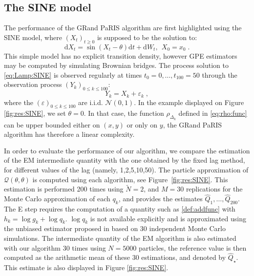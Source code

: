 \documentclass[12pt]{article}
\newcommand{\rmd}{\mathrm{d}}
\newcommand{\eqsp}{\;}
\newcommand{\1}{\mathrm{1}}
\newcommand{\hQ}{\widehat{Q}}
\begin{document}
\subsection*{The SINE model} 
The performance of the GRand PaRIS algorithm are first highlighted using the SINE model, where $(X_t)_{t\geq 0}$ is supposed to be the solution to: 
\begin{equation}
\rmd X_t = \sin \left(X_t-\theta\right)\rmd t + \rmd W_t,~~X_0=x_0\eqsp. \label{eq:Lamp:SINE}
\end{equation}
This simple model has no explicit transition density, however GPE estimators may be computed by simulating Brownian bridges.
The process solution to \eqref{eq:Lamp:SINE} is observed regularly at times $t_0=0,\ldots,t_{100}=50$ through the observation process $(Y_k)_{0\leq k \leq 100}$:
\begin{equation}
Y_k = X_k + \varepsilon_k\label{eq:obs:SINE}\eqsp,
\end{equation}
where the $(\varepsilon)_{0\leq k \leq 100}$ are i.i.d. $\mathcal{N}(0,1)$.
In the example displayed on Figure \ref{fig:res:SINE}, we set $\theta=0$.
In that case, the function $\rho_{\Delta_k}$ defined in \eqref{eq:rho:func} can be upper bounded either on $(x,y)$ or only on $y$, the GRand PaRIS algorithm has therefore a linear complexity.

In order to evaluate the performance of our algorithm, we compare the estimation of the EM intermediate quantity with the one obtained by the fixed lag method, for different values of the lag (namely, 1,2,5,10,50). The particle approximation of $\mathcal{Q}(\theta,\theta)$ is computed using each algorithm, see Figure~\ref{fig:res:SINE}. This estimation is performed 200 times using $\tilde{N}=2$, and $M=30$ replications for the Monte Carlo approximation of each $q_k$, and provides the estimates $\hQ_1,\dots,\hQ_{200}$.  The E step requires the computation of a quantity such as \eqref{def:addfunc} with $h_k= \log g_k + \log q_k$.  $\log q_k$ is not available explicitly and is approximated using the unbiased estimator proposed in \cite[Appendix B]{olsson:strojby:2011} based on 30 independent Monte Carlo simulations.
The intermediate quantity of the EM algorithm is also estimated                                                                                                                                                                                                                                                                                                                                                                                                                                                                                                                                                      with our algorithm 30 times using $N=5000$ particles, the reference value is then computed as the arithmetic mean of these 30 estimations, and denoted by $\hQ_\star$. This estimate is also displayed in Figure \ref{fig:res:SINE}.
\end{document}
